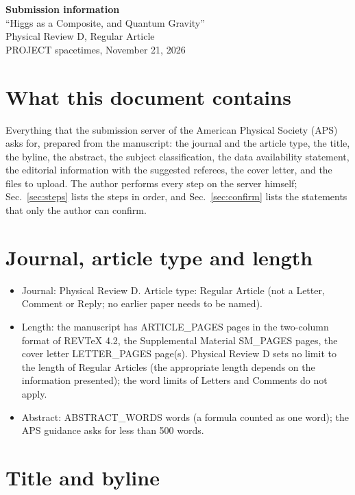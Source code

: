 \documentclass[11pt]{article}
\begin{document}
\begin{center}
{\Large\bf Submission information}\\[4pt]
{\large ``Higgs as a Composite, and Quantum Gravity''}\\[2pt]
Physical Review D, Regular Article\\[2pt]
PROJECT spacetimes, November 21, 2026
\end{center}

\section{What this document contains}

Everything that the submission server of the American Physical Society (APS) asks for, prepared from the manuscript: the
journal and the article type, the title, the byline, the abstract, the subject classification, the data availability
statement, the editorial information with the suggested referees, the cover letter, and the files to upload. The author
performs every step on the server himself; Sec.~\ref{sec:steps} lists the steps in order, and Sec.~\ref{sec:confirm} lists
the statements that only the author can confirm.

\section{Journal, article type and length}

\begin{itemize}
\item Journal: Physical Review D. Article type: Regular Article (not a Letter, Comment or Reply; no earlier paper needs to be
named).
\item Length: the manuscript has {{ARTICLE_PAGES}} pages in the two-column format of REVTeX 4.2, the Supplemental Material
{{SM_PAGES}} pages, the cover letter {{LETTER_PAGES}} page(s). Physical Review D sets no limit to the length of Regular Articles
(the appropriate length depends on the information presented); the word limits of Letters and Comments do not apply.
\item Abstract: {{ABSTRACT_WORDS}} words (a formula counted as one word); the APS guidance asks for less than 500 words.
\end{itemize}

\section{Title and byline}
\label{sec:title}
\end{document}
